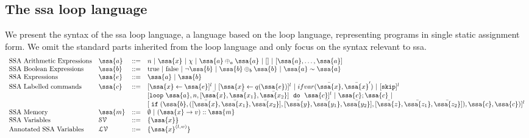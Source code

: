 \subsection{ The ssa loop language }
We present the syntax of the ssa loop language, a language based on the loop language, representing programs in single static assignment form. We omit the standard parts inherited from the loop language and only focus on the syntax relevant to ssa.  
\[
\begin{array}{llll}
\mbox{SSA Arithmetic Expressions} & \ssa{\aexpr} & ::= & 
	{n} ~|~ {\ssa{x}} ~|~ \chi ~|~ \ssa{\aexpr} \oplus_a \ssa{\aexpr} ~|~ [] ~|~ [\ssa{\aexpr}, \dots, \ssa{\aexpr}] \\
\mbox{SSA Boolean Expressions} & \ssa{\bexpr} & ::= & 
	\textrm{true} ~|~ \textrm{false}  ~|~ \neg \ssa{\bexpr}
	 ~|~ \ssa{\bexpr} \oplus_b \ssa{\bexpr}
	~|~ \ssa{\aexpr} \sim \ssa{\aexpr} \\
\mbox{SSA Expressions} & \ssa{\expr} & ::= & \ssa{\aexpr} \sep \ssa{\bexpr} \\	
\mbox{SSA Labelled commands} & \ssa{c} & ::= &   [\assign {\ssa{x}}{ \ssa{\expr}}]^{l} ~|~  [\assign {{\ssa{x}} } {q({\ssa{e}})}]^{l}
%
~|~  {{ifvar(\bar{\ssa{x}}, \bar{\ssa{x}}')}}  ~|~ [\eskip]^{l}  \\ 
&&& [\eloop ~ {\ssa{\aexpr}}, {n},  [\bar{\ssa{x}}, \bar{\ssa{x_1}}, \bar{\ssa{x_2}}] ~ \edo ~ {\ssa{c}} ]^{l} ~|~ \ssa{c};\ssa{c}  ~|~ \\ &&& [\eif(\ssa{\bexpr}, ([\bar{\ssa{x}}, \bar{\ssa{x_1}}, \bar{\ssa{x_2}}] , [\bar{\ssa{y}}, \bar{\ssa{y_1}}, \bar{\ssa{y_2}}],[\bar{\ssa{z}}, \bar{\ssa{z_1}}, \bar{\ssa{z_2}}] ) , \ssa{c}, \ssa{c})]^l 	
	\\
\mbox{SSA Memory} & \ssa{m} & ::= & \emptyset ~|~ { (\ssa{x} \to v) :: \ssa{m} } \\
%
\mbox{SSA Variables} & \mathcal{SV}  & ::= & \{ \ssa{x} \} \\
\mbox{Annotated SSA Variables} & \mathcal{LV}  & ::= & \{ \ssa{x}^{(l,w)}  \}
\end{array}
\]
